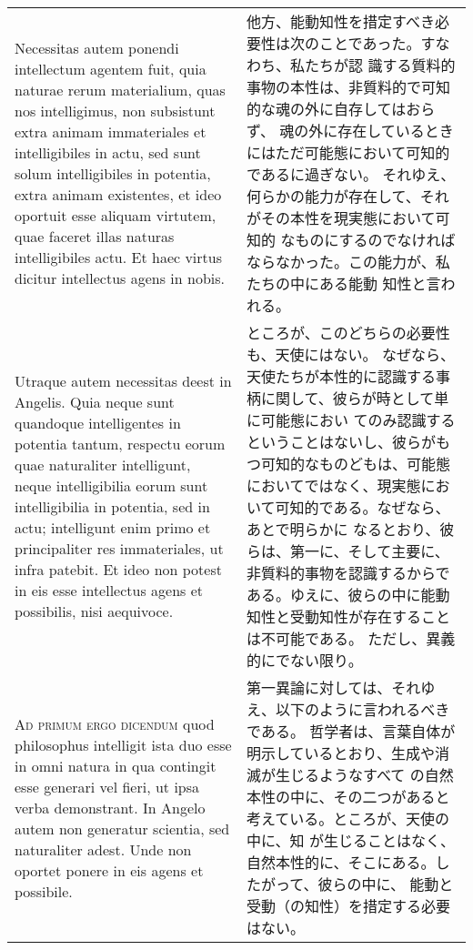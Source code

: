 \documentclass[10pt]{jsarticle} %
\begin{document}
\begin{longtable}{p{21em}p{21em}}
\\



Necessitas
autem ponendi intellectum agentem fuit, quia naturae rerum materialium,
quas nos intelligimus, non subsistunt extra animam immateriales et
intelligibiles in actu, sed sunt solum intelligibiles in potentia, extra
animam existentes, et ideo oportuit esse aliquam virtutem, quae faceret
illas naturas intelligibiles actu. Et haec virtus dicitur intellectus
agens in nobis. 


&

他方、能動知性を措定すべき必要性は次のことであった。すなわち、私たちが認
 識する質料的事物の本性は、非質料的で可知的な魂の外に自存してはおらず、
 魂の外に存在しているときにはただ可能態において可知的であるに過ぎない。
 それゆえ、何らかの能力が存在して、それがその本性を現実態において可知的
 なものにするのでなければならなかった。この能力が、私たちの中にある能動
 知性と言われる。

\\




Utraque autem necessitas deest in Angelis. Quia neque
sunt quandoque intelligentes in potentia tantum, respectu eorum quae
naturaliter intelligunt, neque intelligibilia eorum sunt intelligibilia
in potentia, sed in actu; intelligunt enim primo et principaliter res
immateriales, ut infra patebit. Et ideo non potest in eis esse
intellectus agens et possibilis, nisi aequivoce.

&

ところが、このどちらの必要性も、天使にはない。
なぜなら、天使たちが本性的に認識する事柄に関して、彼らが時として単に可能態におい
 てのみ認識するということはないし、彼らがもつ可知的なものどもは、可能態
 においてではなく、現実態において可知的である。なぜなら、あとで明らかに
 なるとおり、彼らは、第一に、そして主要に、非質料的事物を認識するからで
 ある。ゆえに、彼らの中に能動知性と受動知性が存在することは不可能である。
 ただし、異義的にでない限り。


\\


{\scshape Ad primum ergo dicendum} quod philosophus
intelligit ista duo esse in omni natura in qua contingit esse generari
vel fieri, ut ipsa verba demonstrant. In Angelo autem non generatur
scientia, sed naturaliter adest. Unde non oportet ponere in eis agens et
possibile.

&


第一異論に対しては、それゆえ、以下のように言われるべきである。
哲学者は、言葉自体が明示しているとおり、生成や消滅が生じるようなすべて
 の自然本性の中に、その二つがあると考えている。ところが、天使の中に、知
 が生じることはなく、自然本性的に、そこにある。したがって、彼らの中に、
 能動と受動（の知性）を措定する必要はない。


\end{longtable}
\end{document}
